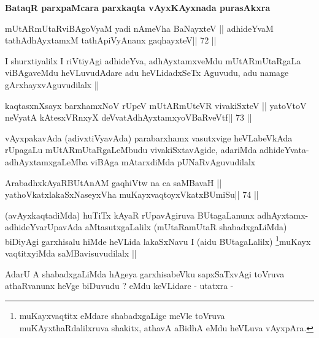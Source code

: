 \begin{center}
\textbf{BataqR parxpaMcara parxkaqta vAyxKAyxnada purasAkxra}
\end{center}



\begin{shl}
mUtARmUtaRviBAgoV\s yaM yadi nAmeVha BaNayxteV ||
adhideYvaM tathA\s dhAyxtamxM tathA\s piVyAnanx gaqhayxteV\hfill || 72 ||
\end{shl}

\begin{artha}
I shurxtiyalilx I riVtiyAgi adhideYva, adhAyxtamxveMdu mUtARmUtaRgaLa
viBAgaveMdu heVLuvudAdare adu heVLidadxSeTx Aguvudu, adu namage
gArxhayxvAguvudilalx ||
\end{artha}



\begin{shl}
kaqtasxnXsayx barxhamxNoV rUpeV mUtARmUteVR vivakiSxteV ||
yatoV\s toV neVyatA kAtesxVRnxyX deVvatAdhAyxtamxyoVBaRveVtf\hfill || 73 ||
\end{shl}

\begin{artha}
vAyxpakavAda (adivxtiVyavAda) parabarxhamx vasutxvige heVLabeVkAda
rUpagaLu mUtARmUtaRgaLeMbudu vivakiSxtavAgide, adariMda
adhideYvata-adhAyxtamxgaLeMba viBAga mAtarxdiMda pUNaRvAguvudilalx
\end{artha}

\begin{shl}
ArabadhxkAyaRBUtAnAM gaqhiVtw na ca saMBavaH ||
yathoVkatxlakaSxNaseyxVha muKayxvaqtoyxVkatxBUmiSu\hfill || 74 ||
\end{shl}

\begin{artha}
(avAyxkaqtadiMda) huTiTx kAyaR rUpavAgiruva BUtagaLanunx
  adhAyxtamx-adhideYvarUpavAda aMtasutxgaLalilx (mUtaRamUtaR
  shabadxgaLiMda) biDiyAgi garxhisalu hiMde heVLida lakaSxNavu I (aidu
  BUtagaLalilx) \footnote[1]{muKayxvaqtitx eMdare shabadxgaLige meVle
    toVruva muKAyxthaRdalilxruva shakitx, athavA aBidhA eMdu heVLuva 
    vAyxpAra.}muKayx vaqtitxyiMda saMBavisuvudilalx ||
\end{artha}

\begin{artha}
AdarU A shabadxgaLiMda hAgeya garxhisabeVku sapxSaTxvAgi toVruva
athaRvanunx heVge biDuvudu ? eMdu keVLidare - utatxra -
\end{artha}

